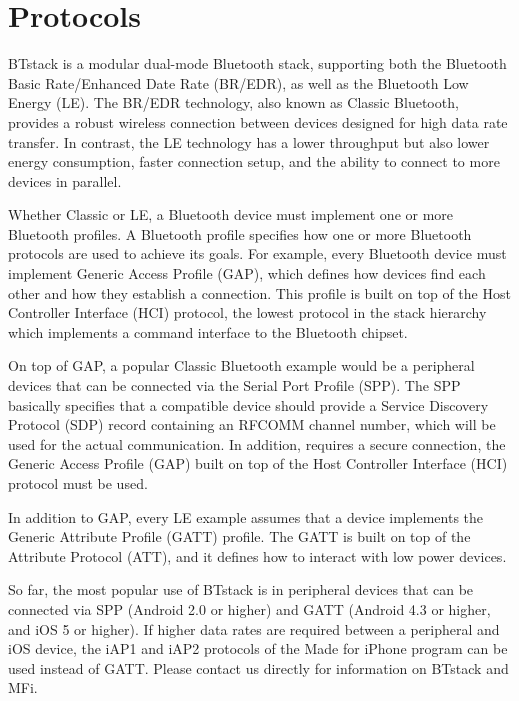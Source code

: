 
\pagebreak

\section{Protocols}
\label{section:protocols_profiles}

BTstack is a modular dual-mode Bluetooth stack, supporting both the Bluetooth Basic Rate/Enhanced Date Rate (BR/EDR), as well as the Bluetooth Low Energy (LE). The BR/EDR technology, also known as Classic Bluetooth, provides a robust wireless connection between devices designed for high data rate transfer. In contrast, the LE technology has a lower throughput but also lower energy consumption, faster connection setup, and the ability to connect to more devices in parallel.

Whether Classic or LE, a Bluetooth device must implement one or more Bluetooth profiles. A Bluetooth profile specifies how one or more Bluetooth protocols are used to achieve its goals. For example, every Bluetooth device must implement Generic Access Profile (GAP), which defines how devices find each other and how they establish a connection. This profile is built on top of the Host Controller Interface (HCI) protocol, the lowest protocol in the stack hierarchy which implements a command interface to the Bluetooth chipset.

On top of GAP, a popular Classic Bluetooth example would be a peripheral devices that can be connected via the Serial Port Profile (SPP). The SPP basically specifies that a compatible device should provide a Service Discovery Protocol (SDP) record containing an RFCOMM channel number, which will be used for the actual communication. In addition,  requires a secure connection, the Generic Access Profile (GAP) built on top of the Host Controller Interface (HCI) protocol must be used. 

In addition to GAP, every LE example assumes that a device implements the Generic Attribute Profile (GATT) profile. The GATT is built on top of the Attribute Protocol (ATT), and it defines how to interact with low power devices.

So far, the most popular use of BTstack is in peripheral devices that can be connected via SPP (Android 2.0 or higher) and GATT (Android 4.3 or higher, and iOS 5 or higher). If higher data rates are required between a peripheral and iOS device, the iAP1 and iAP2 protocols of the Made for iPhone program can be used instead of GATT. Please contact us directly for information on BTstack  and MFi.

